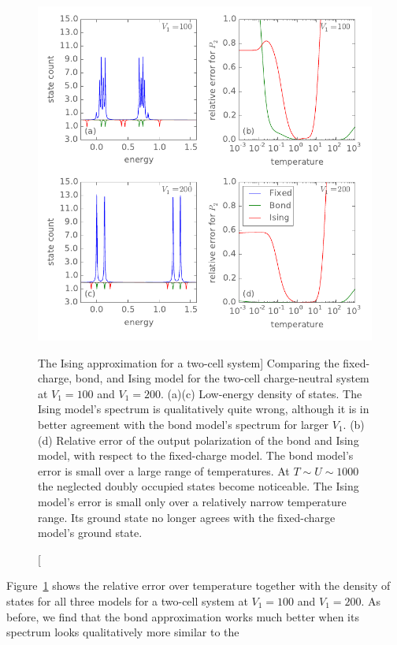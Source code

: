 %
\begin{figure}
  \center
  \includegraphics{ising_approximation2}
  \caption
  [The Ising approximation for a two-cell system]
  {
  Comparing the fixed-charge, bond, and Ising model for the two-cell
  charge-neutral  system at $V_1 = 100$ and $V_1 = 200$. (a)(c)
  Low-energy density of states. The Ising model's spectrum is qualitatively
  quite wrong, although it is in better agreement with the bond model's spectrum
  for larger $V_1$. (b)(d) Relative error of the output polarization of the bond
  and Ising model, with respect to the fixed-charge model. The bond model's
  error is small over a large range of temperatures. At $T \sim U \sim 1000$ the
  neglected doubly occupied states become noticeable. The Ising model's error is
  small only over a relatively narrow temperature range. Its ground state no
  longer agrees with the fixed-charge model's ground state.
  }
  \label{fig:ising_approximation2}
\end{figure}
%
Figure~\ref{fig:ising_approximation2} shows the relative error over temperature
together with the density of states for all three models for a two-cell system
at $V_1 = 100$ and $V_1 = 200$. As before, we find that the bond approximation
works much better when its spectrum looks qualitatively more similar to the
